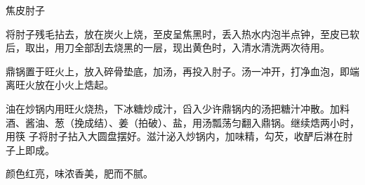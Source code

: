 %
%
%
%
%
%
%
\begin{recipe}{焦皮肘子}

\ingredients


\preparation

\step 将肘子残毛拈去，放在炭火上烧，至皮呈焦黑时，丢入热水内泡半点钟，至皮已软
后，取出，用刀全部刮去烧黑的一层，现出黄色时，入清水清洗两次待用。

\step 鼎锅置于旺火上，放入碎骨垫底，加汤，再投入肘子。汤一冲开，打净血泡，即端
离旺火放在小火上焅起。

\step 油在炒锅内用旺火烧热，下冰糖炒成汁，舀入少许鼎锅内的汤把糖汁冲散。加料
酒、酱油、葱（挽成结）、姜（拍破）、盐，用汤瓢荡匀翻入鼎锅。继续焅两小时，用筷
子将肘子拈入大圆盘摆好。滋汁泌入炒锅内，加味精，勾芡，收酽后淋在肘子上即成。

\features

颜色红亮，味浓香美，肥而不腻。

\end{recipe}

